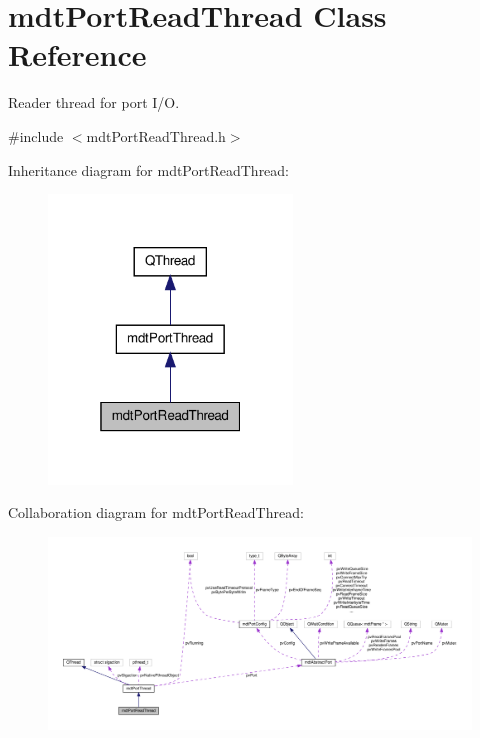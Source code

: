 \hypertarget{classmdt_port_read_thread}{\section{mdt\-Port\-Read\-Thread Class Reference}
\label{classmdt_port_read_thread}
}


Reader thread for port I/\-O.  




{\ttfamily \#include $<$mdt\-Port\-Read\-Thread.\-h$>$}



Inheritance diagram for mdt\-Port\-Read\-Thread\-:\nopagebreak
\begin{figure}[H]
\begin{center}
\leavevmode
\includegraphics[width=184pt]{classmdt_port_read_thread__inherit__graph}
\end{center}
\end{figure}


Collaboration diagram for mdt\-Port\-Read\-Thread\-:
\nopagebreak
\begin{figure}[H]
\begin{center}
\leavevmode
\includegraphics[width=350pt]{classmdt_port_read_thread__coll__graph}
\end{center}
\end{figure}
